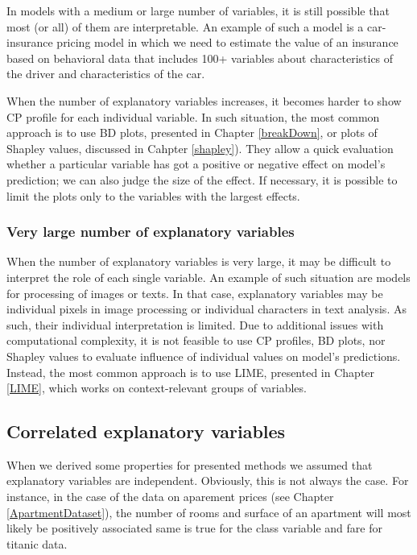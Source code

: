 \documentclass[12pt,]{krantz}
\begin{document}
In models with a medium or large number of variables, it is still possible that most (or all) of them are interpretable. An example of such a model is a car-insurance pricing model in which we need to estimate the value of an insurance based on behavioral data that includes 100+ variables about characteristics of the driver and characteristics of the car.

When the number of explanatory variables increases, it becomes harder to show CP profile for each individual variable. In such situation, the most common approach is to use BD plots, presented in Chapter \ref{breakDown}, or plots of Shapley values, discussed in Cahpter \ref{shapley}). They allow a quick evaluation whether a particular variable has got a positive or negative effect on model's prediction; we can also judge the size of the effect. If necessary, it is possible to limit the plots only to the variables with the largest effects.

\hypertarget{very-large-number-of-explanatory-variables}{%
\subsubsection{Very large number of explanatory variables}\label{very-large-number-of-explanatory-variables}}

When the number of explanatory variables is very large, it may be difficult to interpret the role of each single variable. An example of such situation are models for processing of images or texts. In that case, explanatory variables may be individual pixels in image processing or individual characters in text analysis. As such, their individual interpretation is limited. Due to additional issues with computational complexity, it is not feasible to use CP profiles, BD plots, nor Shapley values to evaluate influence of individual values on model's predictions. Instead, the most common approach is to use LIME, presented in Chapter \ref{LIME}, which works on context-relevant groups of variables.

\hypertarget{correlated-explanatory-variables}{%
\subsection{Correlated explanatory variables}\label{correlated-explanatory-variables}}

When we derived some properties for presented methods we assumed that explanatory variables are independent. Obviously, this is not always the case. For instance, in the case of the data on aparement prices (see Chapter \ref{ApartmentDataset}), the number of rooms and surface of an apartment will most likely be positively associated same is true for the class variable and fare for titanic data.
\end{document}
